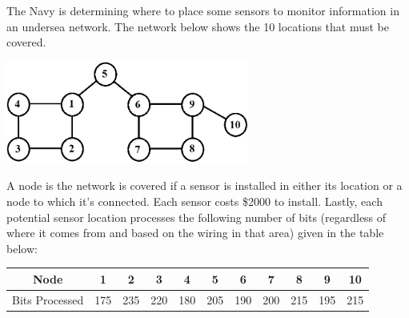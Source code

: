 \documentclass[12pt]{exam}
\begin{document}
\begin{questions}
\newpage

\question The Navy is determining where to place some sensors to monitor information in an undersea network. The network below shows the 10 locations that must be covered.
\begin{center}
    \includegraphics[width=0.6\textwidth]{10nodegraph.png}
\end{center}

A node is the network is covered if a sensor is installed in either its location or a node to which it's connected. Each sensor costs \$2000 to install. Lastly, each potential sensor location processes the following number of bits (regardless of where it comes from and based on the wiring in that area) given in the table below:

\begin{center}
\begin{tabular}{c|cccccccccc} 
Node & 1 & 2 & 3 & 4 & 5 & 6 & 7 & 8 & 9 & 10  \\\hline
Bits Processed & 175 & 235 & 220 & 180 & 205 & 190 & 200 & 215 & 195 & 215
\end{tabular}
\end{center}


\end{questions}
\end{document}
